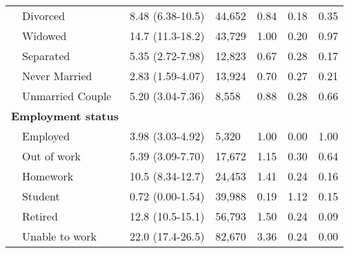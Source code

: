 \begin{table}[H]
\begin{center}
\begin{tabular}{llllll}
~~Divorced&8.48 (6.38-10.5)& 44,652&0.84&0.18&0.35\tabularnewline
~~Widowed&14.7 (11.3-18.2)& 43,729&1.00&0.20&0.97\tabularnewline
~~Separated&5.35 (2.72-7.98)& 12,823&0.67&0.28&0.17\tabularnewline
~~Never Married&2.83 (1.59-4.07)& 13,924&0.70&0.27&0.21\tabularnewline
~~Unmarried Couple&5.20 (3.04-7.36)&  8,558&0.88&0.28&0.66\tabularnewline
\hline
{\bfseries Employment status}&&&&&\tabularnewline
~~Employed&3.98 (3.03-4.92)& 5,320&1.00&0.00&1.00\tabularnewline
~~Out of work&5.39 (3.09-7.70)&17,672&1.15&0.30&0.64\tabularnewline
~~Homework&10.5 (8.34-12.7)&24,453&1.41&0.24&0.16\tabularnewline
~~Student&0.72 (0.00-1.54)&39,988&0.19&1.12&0.15\tabularnewline
~~Retired&12.8 (10.5-15.1)&56,793&1.50&0.24&0.09\tabularnewline
~~Unable to work&22.0 (17.4-26.5)&82,670&3.36&0.24&0.00\tabularnewline
\hline
\end{tabular}\end{center}

\end{table}

 

